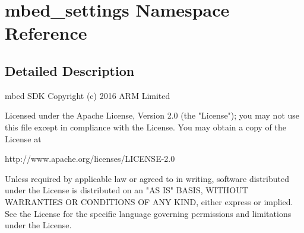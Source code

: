 \hypertarget{namespacembed__settings}{}\section{mbed\+\_\+settings Namespace Reference}
\label{namespacembed__settings}


\subsection{Detailed Description}
\begin{DoxyVerb}mbed SDK
Copyright (c) 2016 ARM Limited

Licensed under the Apache License, Version 2.0 (the "License");
you may not use this file except in compliance with the License.
You may obtain a copy of the License at

http://www.apache.org/licenses/LICENSE-2.0

Unless required by applicable law or agreed to in writing, software
distributed under the License is distributed on an "AS IS" BASIS,
WITHOUT WARRANTIES OR CONDITIONS OF ANY KIND, either express or implied.
See the License for the specific language governing permissions and
limitations under the License.
\end{DoxyVerb}
 